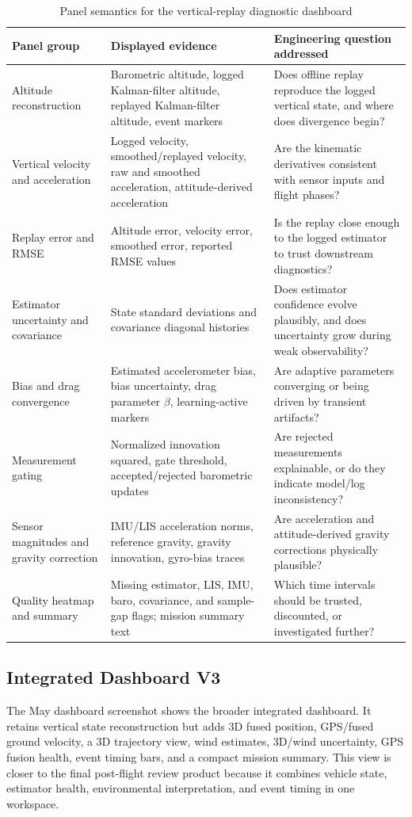 \documentclass[colorlinks,upint,subscriptcorrection,varvw,hyphenate,balance]{asmeconf}
\begin{document}
\begin{table}[t]
\caption{Panel semantics for the vertical-replay diagnostic dashboard}
\centering
\begin{tabularx}{\textwidth}{l Y Y}
\toprule
Panel group & Displayed evidence & Engineering question addressed \\
\midrule
Altitude reconstruction & Barometric altitude, logged Kalman-filter altitude, replayed Kalman-filter altitude, event markers & Does offline replay reproduce the logged vertical state, and where does divergence begin? \\
Vertical velocity and acceleration & Logged velocity, smoothed/replayed velocity, raw and smoothed acceleration, attitude-derived acceleration & Are the kinematic derivatives consistent with sensor inputs and flight phases? \\
Replay error and RMSE & Altitude error, velocity error, smoothed error, reported RMSE values & Is the replay close enough to the logged estimator to trust downstream diagnostics? \\
Estimator uncertainty and covariance & State standard deviations and covariance diagonal histories & Does estimator confidence evolve plausibly, and does uncertainty grow during weak observability? \\
Bias and drag convergence & Estimated accelerometer bias, bias uncertainty, drag parameter $\beta$, learning-active markers & Are adaptive parameters converging or being driven by transient artifacts? \\
Measurement gating & Normalized innovation squared, gate threshold, accepted/rejected barometric updates & Are rejected measurements explainable, or do they indicate model/log inconsistency? \\
Sensor magnitudes and gravity correction & IMU/LIS acceleration norms, reference gravity, gravity innovation, gyro-bias traces & Are acceleration and attitude-derived gravity corrections physically plausible? \\
Quality heatmap and summary & Missing estimator, LIS, IMU, baro, covariance, and sample-gap flags; mission summary text & Which time intervals should be trusted, discounted, or investigated further? \\
\bottomrule
\end{tabularx}
\label{tab:vertical_dashboard_panels}
\end{table}

\subsection{Integrated Dashboard V3}
The May dashboard screenshot shows the broader integrated dashboard. It retains vertical state reconstruction but adds 3D fused position, GPS/fused ground velocity, a 3D trajectory view, wind estimates, 3D/wind uncertainty, GPS fusion health, event timing bars, and a compact mission summary. This view is closer to the final post-flight review product because it combines vehicle state, estimator health, environmental interpretation, and event timing in one workspace.
\end{document}
